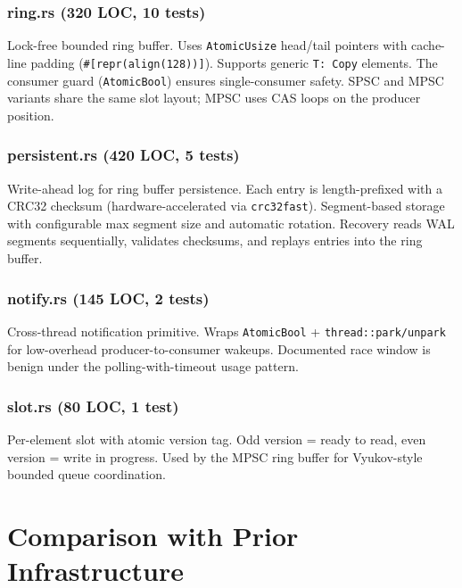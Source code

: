 \documentclass[a4paper, 11pt]{article}
\begin{document}
\subsubsection{ring.rs (320 LOC, 10 tests)}

Lock-free bounded ring buffer.  Uses \texttt{AtomicUsize} head/tail
pointers with cache-line padding (\texttt{\#[repr(align(128))]}).
Supports generic \texttt{T: Copy} elements.  The consumer guard
(\texttt{AtomicBool}) ensures single-consumer safety.  SPSC and MPSC
variants share the same slot layout; MPSC uses CAS loops on the
producer position.

\subsubsection{persistent.rs (420 LOC, 5 tests)}

Write-ahead log for ring buffer persistence.  Each entry is
length-prefixed with a CRC32 checksum (hardware-accelerated via
\texttt{crc32fast}).  Segment-based storage with configurable max
segment size and automatic rotation.  Recovery reads WAL segments
sequentially, validates checksums, and replays entries into the
ring buffer.

\subsubsection{notify.rs (145 LOC, 2 tests)}

Cross-thread notification primitive.  Wraps \texttt{AtomicBool} +
\texttt{thread::park/unpark} for low-overhead producer-to-consumer
wakeups.  Documented race window is benign under the polling-with-timeout
usage pattern.

\subsubsection{slot.rs (80 LOC, 1 test)}

Per-element slot with atomic version tag.  Odd version = ready to read,
even version = write in progress.  Used by the MPSC ring buffer for
Vyukov-style bounded queue coordination.


\section{Comparison with Prior Infrastructure}
\end{document}
